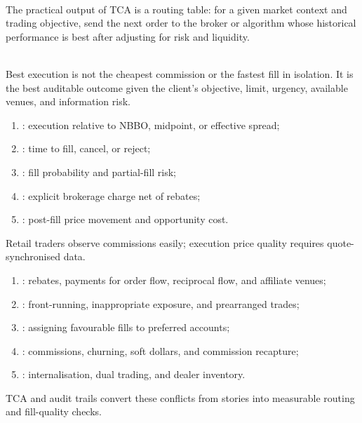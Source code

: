 \documentclass[a4paper,oneside,openany]{book}
\begin{document}
\begin{practitionernote} \\
The practical output of TCA is a routing table: for a given market context and trading objective, send the next order to the broker or algorithm whose historical performance is best after adjusting for risk and liquidity.
\end{practitionernote}

\begin{principle} \\
Best execution is not the cheapest commission or the fastest fill in isolation. It is the best auditable outcome given the client's objective, limit, urgency, available venues, and information risk.
\end{principle}

\begin{taxonomy} 
\begin{enumerate}[label=\roman*.]
\setlength{\itemsep}{0pt}
\item {}: execution relative to NBBO, midpoint, or effective spread;
\item {}: time to fill, cancel, or reject;
\item {}: fill probability and partial-fill risk;
\item {}: explicit brokerage charge net of rebates;
\item {}: post-fill price movement and opportunity cost.
\end{enumerate}
Retail traders observe commissions easily; execution price quality requires quote-synchronised data.
\end{taxonomy}

\begin{taxonomy} 
\begin{enumerate}[label=\roman*.]
\setlength{\itemsep}{0pt}
\item {}: rebates, payments for order flow, reciprocal flow, and affiliate venues;
\item {}: front-running, inappropriate exposure, and prearranged trades;
\item {}: assigning favourable fills to preferred accounts;
\item {}: commissions, churning, soft dollars, and commission recapture;
\item {}: internalisation, dual trading, and dealer inventory.
\end{enumerate}
TCA and audit trails convert these conflicts from stories into measurable routing and fill-quality checks.
\end{taxonomy}
\end{document}
